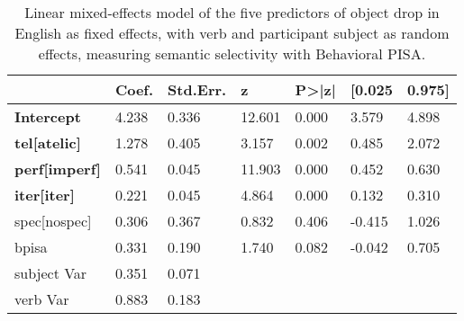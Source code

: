 \begin{table}[htb] %
\caption{Linear mixed-effects model of the five predictors of object drop in English as fixed effects, with verb and participant subject as random effects, measuring semantic selectivity with Behavioral PISA.}
\begin{tabular}{l|llllll}
                         & Coef. & Std.Err. & z      & P\textgreater{}|z| & {[}0.025 & 0.975{]} \\
\hline                         
\textbf{Intercept}                & 4.238 & 0.336    & 12.601 & 0.000              & 3.579    & 4.898    \\
\textbf{tel{[}atelic{]}}     & 1.278 & 0.405    & 3.157  & 0.002              & 0.485    & 2.072    \\
\textbf{perf{[}imperf{]}} & 0.541 & 0.045    & 11.903 & 0.000              & 0.452    & 0.630    \\
\textbf{iter{[}iter{]}}    & 0.221 & 0.045    & 4.864  & 0.000              & 0.132    & 0.310    \\
spec{[}nospec{]}     & 0.306 & 0.367    & 0.832  & 0.406              & -0.415   & 1.026    \\
bpisa                    & 0.331 & 0.190    & 1.740  & 0.082              & -0.042   & 0.705    \\
subject                  Var   & 0.351    & 0.071  &                    &          &    &      \\
verb                     Var   & 0.883    & 0.183  &                    &          &     &       
\end{tabular}
\end{table}

